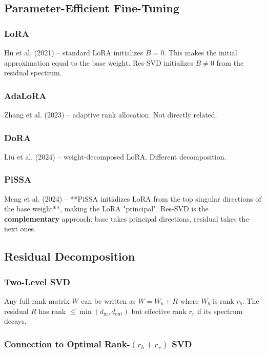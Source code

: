 \subsection{Parameter-Efficient Fine-Tuning}

\subsubsection{LoRA}

Hu et al. (2021) -- standard LoRA initializes $B = 0$. This makes the 
initial approximation equal to the base weight. Res-SVD initializes 
$B \neq 0$ from the residual spectrum.

\subsubsection{AdaLoRA}

Zhang et al. (2023) -- adaptive rank allocation. Not directly related.

\subsubsection{DoRA}

Liu et al. (2024) -- weight-decomposed LoRA. Different decomposition.

\subsubsection{PiSSA}

Meng et al. (2024) -- **PiSSA initializes LoRA from the top singular 
directions of the base weight**, making the LoRA "principal". Res-SVD is 
the \textbf{complementary} approach: base takes principal directions, residual 
takes the next ones.

\subsection{Residual Decomposition}

\subsubsection{Two-Level SVD}

Any full-rank matrix $W$ can be written as $W = W_b + R$ where $W_b$ is 
rank $r_b$. The residual $R$ has rank $\leq \min(d_\text{in}, d_\text{out})$ 
but effective rank $r_r$ if its spectrum decays.

\subsubsection{Connection to Optimal Rank-$(r_b + r_r)$ SVD}

